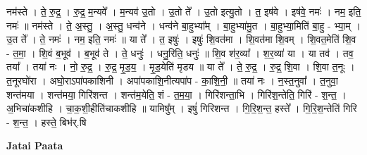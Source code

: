 \documentclass[17pt]{extarticle}
\begin{document}
नम॑स्ते । ते॒ रु॒द्र॒ । रु॒द्र॒ म॒न्यवे᳚ । म॒न्यव॑ उ॒तो । उ॒तो ते᳚ । उ॒तो इत्यु॒तो । त॒ इष॑वे । इष॑वे॒ नमः॑ । नम॒ इति॒ नमः॑ ॥ नम॑स्ते । ते॒ अ॒स्तु॒ । अ॒स्तु॒ धन्व॑ने । धन्व॑ने बा॒हुभ्या᳚म् । बा॒हुभ्या॑मु॒त । बा॒हुभ्या॒मिति॑ बा॒हु - भ्या॒म् । उ॒त ते᳚ । ते॒ नमः॑ । नम॒ इति॒ नमः॑ ॥ या ते᳚ । त॒ इषुः॑ । इषुः॑ शि॒वत॑मा । शि॒वत॑मा शि॒वम् । शि॒वत॒मेति॑ शि॒व - त॒मा॒ । शि॒वं ब॒भूव॑ । ब॒भूव॑ ते । ते॒ धनुः॑ । धनु॒रिति॒ धनुः॑ ॥ शि॒व श॑र॒व्या᳚ । श॒र॒व्या॑ या । या तव॑ । तव॒ तया᳚ । तया॑ नः । नो॒ रु॒द्र॒ । रु॒द्र॒ मृ॒ड॒य॒ । मृ॒ड॒येति॑ मृडय ॥ या ते᳚ । ते॒ रु॒द्र॒ । रु॒द्र॒ शि॒वा । शि॒वा त॒नूः । त॒नूरघो॑रा । अघो॒राऽपा॑पकाशिनी । अपा॑पकाशि॒नीत्यपा॑प - का॒शि॒नी॒ ॥ तया॑ नः । न॒स्त॒नुवा᳚ । त॒नुवा॒ शन्त॑मया । शन्त॑मया॒ गिरि॑शन्त । शन्त॑म॒येति॒ शं - त॒म॒या॒ । गिरि॑शन्ता॒भि । गिरि॑श॒न्तेति॒ गिरि॑ - श॒न्त॒ । अ॒भिचा॑कशीहि । चा॒क॒शी॒हीति॑चाकशीहि ॥ यामिषु᳚म् । इषुं॑ गिरिशन्त । गि॒रि॒श॒न्त॒ हस्ते᳚ । गि॒रि॒श॒न्तेति॑ गिरि - श॒न्त॒ । हस्ते॒ बिभ॑र्.षि \newline

\textbf{Jatai Paata} \newline
\end{document}
